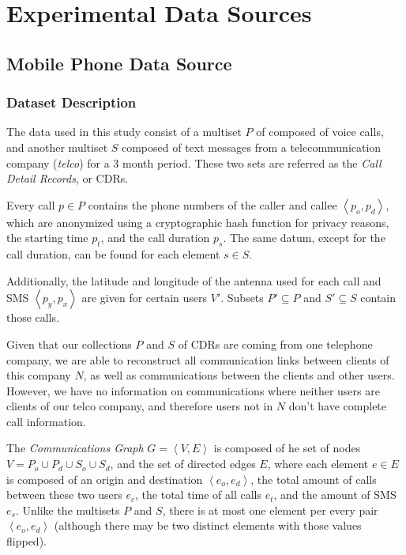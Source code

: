 

\chapter{Experimental Data Sources}
\label{sec:dataset}

\section{Mobile Phone Data Source}
\label{subsec:mobiledatasource}

\subsection{Dataset Description}
\label{subsec:dataset_description}

The data used in this study consist of a multiset $P$ of composed of voice calls, and another multiset $S$ composed of text messages from a telecommunication company (\textit{telco}) for a 3 month period. These two sets are referred as the \emph{Call Detail Records}, or CDRs.

Every call $p \in P$ contains the phone numbers of the caller and callee $\left< p_o, p_d \right>$, which are anonymized using a cryptographic hash function for privacy reasons, the starting time $p_t$, and the call duration $p_s$. The same datum, except for the call duration, can be found for each element $s \in S$.

Additionally, the latitude and longitude of the antenna used for each call and SMS $\left< p_y, p_x \right>$  are given for certain users $V'$. Subsets $P' \subseteq P$ and $S' \subseteq S$ contain those calls.

Given that our collections $P$ and $S$ of CDRs are coming from one telephone company, we are able to reconstruct all communication links between clients of this company $N$, as well as communications between the clients and other users. However, we have no information on communications where neither users are clients of our telco company, and therefore users not in $N$ don't have complete call information.

The \emph{Communications Graph} $G = \left< V, E \right>$ is composed of he set of nodes $V = P_o \cup P_d \cup S_o \cup S_d$, and the set of directed edges $E$, where each element $e \in E$ is composed of an origin and destination $\left< e_o, e_d \right>$, the total amount of calls between these two users $e_c$, the total time of all calls $e_t$, and the amount of SMS $e_s$. Unlike the multisets $P$ and $S$, there is at most one element per every pair $\left< e_o, e_d \right>$ (although there may be two distinct elements with those values flipped).

